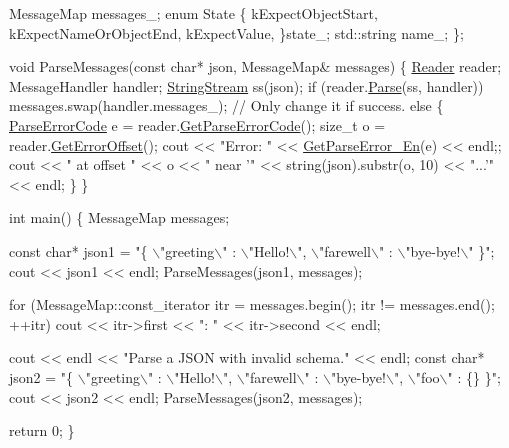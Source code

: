 \begin{DoxyCode}
    MessageMap messages\_;
    \textcolor{keyword}{enum} State \{
        kExpectObjectStart,
        kExpectNameOrObjectEnd,
        kExpectValue,
    \}state\_;
    std::string name\_;
\};

\textcolor{keywordtype}{void} ParseMessages(\textcolor{keyword}{const} \textcolor{keywordtype}{char}* json, MessageMap& messages) \{
    \hyperlink{class_generic_reader}{Reader} reader;
    MessageHandler handler;
    \hyperlink{struct_generic_string_stream}{StringStream} ss(json);
    \textcolor{keywordflow}{if} (reader.\hyperlink{class_generic_reader_a0c450620d14ff1824e58bb7bd9b42099}{Parse}(ss, handler))
        messages.swap(handler.messages\_);   \textcolor{comment}{// Only change it if success.}
    \textcolor{keywordflow}{else} \{
        \hyperlink{group___r_a_p_i_d_j_s_o_n___e_r_r_o_r_s_ga8d4b32dfc45840bca189ade2bbcb6ba7}{ParseErrorCode} e = reader.\hyperlink{class_generic_reader_ac45a26246877c4daa85021ae67caa017}{GetParseErrorCode}();
        \textcolor{keywordtype}{size\_t} o = reader.\hyperlink{class_generic_reader_a77399ac40cca1fb113a2d507f476b4e7}{GetErrorOffset}();
        cout << \textcolor{stringliteral}{"Error: "} << \hyperlink{group___r_a_p_i_d_j_s_o_n___e_r_r_o_r_s_ga755b523205f46c980c80d12e230a3abd}{GetParseError\_En}(e) << endl;;
        cout << \textcolor{stringliteral}{" at offset "} << o << \textcolor{stringliteral}{" near '"} << string(json).substr(o, 10) << \textcolor{stringliteral}{"...'"} << endl;
    \}
\}

\textcolor{keywordtype}{int} main() \{
    MessageMap messages;

    \textcolor{keyword}{const} \textcolor{keywordtype}{char}* json1 = \textcolor{stringliteral}{"\{ \(\backslash\)"greeting\(\backslash\)" : \(\backslash\)"Hello!\(\backslash\)", \(\backslash\)"farewell\(\backslash\)" : \(\backslash\)"bye-bye!\(\backslash\)" \}"};
    cout << json1 << endl;
    ParseMessages(json1, messages);

    \textcolor{keywordflow}{for} (MessageMap::const\_iterator itr = messages.begin(); itr != messages.end(); ++itr)
        cout << itr->first << \textcolor{stringliteral}{": "} << itr->second << endl;

    cout << endl << \textcolor{stringliteral}{"Parse a JSON with invalid schema."} << endl;
    \textcolor{keyword}{const} \textcolor{keywordtype}{char}* json2 = \textcolor{stringliteral}{"\{ \(\backslash\)"greeting\(\backslash\)" : \(\backslash\)"Hello!\(\backslash\)", \(\backslash\)"farewell\(\backslash\)" : \(\backslash\)"bye-bye!\(\backslash\)", \(\backslash\)"foo\(\backslash\)" : \{\} \}"};
    cout << json2 << endl;
    ParseMessages(json2, messages);

    \textcolor{keywordflow}{return} 0;
\}
\end{DoxyCode}



